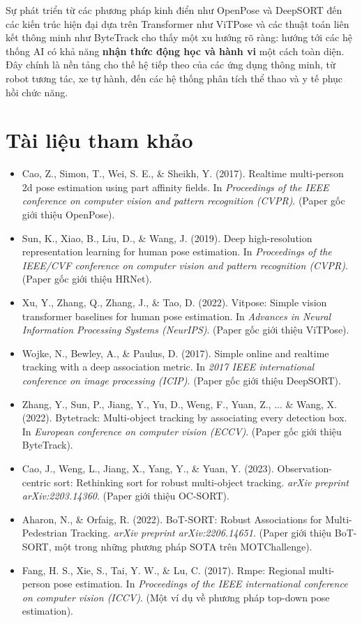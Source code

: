 Sự phát triển từ các phương pháp kinh điển như OpenPose và DeepSORT đến các kiến trúc hiện đại dựa trên Transformer như ViTPose và các thuật toán liên kết thông minh như ByteTrack cho thấy một xu hướng rõ ràng: hướng tới các hệ thống AI có khả năng \textbf{nhận thức động học và hành vi} một cách toàn diện. Đây chính là nền tảng cho thế hệ tiếp theo của các ứng dụng thông minh, từ robot tương tác, xe tự hành, đến các hệ thống phân tích thể thao và y tế phục hồi chức năng.

\section*{Tài liệu tham khảo}
\begin{itemize}
	\item[1] Cao, Z., Simon, T., Wei, S. E., \& Sheikh, Y. (2017). Realtime multi-person 2d pose estimation using part affinity fields. In \textit{Proceedings of the IEEE conference on computer vision and pattern recognition (CVPR)}. (Paper gốc giới thiệu OpenPose).
	\item[2] Sun, K., Xiao, B., Liu, D., \& Wang, J. (2019). Deep high-resolution representation learning for human pose estimation. In \textit{Proceedings of the IEEE/CVF conference on computer vision and pattern recognition (CVPR)}. (Paper gốc giới thiệu HRNet).
	\item[3] Xu, Y., Zhang, Q., Zhang, J., \& Tao, D. (2022). Vitpose: Simple vision transformer baselines for human pose estimation. In \textit{Advances in Neural Information Processing Systems (NeurIPS)}. (Paper gốc giới thiệu ViTPose).
	\item[4] Wojke, N., Bewley, A., \& Paulus, D. (2017). Simple online and realtime tracking with a deep association metric. In \textit{2017 IEEE international conference on image processing (ICIP)}. (Paper gốc giới thiệu DeepSORT).
	\item[5] Zhang, Y., Sun, P., Jiang, Y., Yu, D., Weng, F., Yuan, Z., ... \& Wang, X. (2022). Bytetrack: Multi-object tracking by associating every detection box. In \textit{European conference on computer vision (ECCV)}. (Paper gốc giới thiệu ByteTrack).
	\item[6] Cao, J., Weng, L., Jiang, X., Yang, Y., \& Yuan, Y. (2023). Observation-centric sort: Rethinking sort for robust multi-object tracking. \textit{arXiv preprint arXiv:2203.14360}. (Paper giới thiệu OC-SORT).
	\item[7] Aharon, N., \& Orfaig, R. (2022). BoT-SORT: Robust Associations for Multi-Pedestrian Tracking. \textit{arXiv preprint arXiv:2206.14651}. (Paper giới thiệu BoT-SORT, một trong những phương pháp SOTA trên MOTChallenge).
	\item[8] Fang, H. S., Xie, S., Tai, Y. W., \& Lu, C. (2017). Rmpe: Regional multi-person pose estimation. In \textit{Proceedings of the IEEE international conference on computer vision (ICCV)}. (Một ví dụ về phương pháp top-down pose estimation).
\end{itemize}
